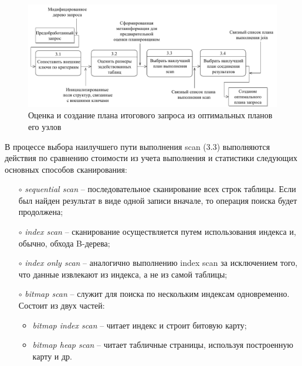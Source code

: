 \begin{figure}[ht!]
	\captionsetup{justification=centering}
	\includegraphics[scale=0.6]{images/dfd_level_3}
	\caption{Оценка и создание плана итогового запроса из оптимальных планов его узлов}
	\label{image:dfd_level_3}
\end{figure}

В процессе выбора наилучшего пути выполнения scan (3.3) выполняются действия по сравнению стоимости из учета выполнения и статистики следующих основных способов сканирования:
\begin{itemize}
	\item[$\circ$] \textit{sequential scan} -- последовательное сканирование всех строк таблицы. Если был найден результат в виде одной записи вначале, то операция поиска будет продолжена; \vspace{-0.2cm}
	\item[$\circ$] \textit{index scan} -- сканирование осуществляется путем использования индекса и, обычно, обхода B-дерева;\vspace{-0.2cm}
	\item[$\circ$] \textit{index only scan} -- аналогично выполнению index scan за исключением того, что данные извлекают из индекса, а не из самой таблицы;\vspace{-0.2cm}
	\item[$\circ$] \textit{bitmap scan} -- служит для поиска по нескольким индексам одновременно. Состоит из двух частей:\vspace{-0.2cm}
	\begin{itemize}
		\item \textit{bitmap index scan} -- читает индекс и строит битовую карту;\vspace{-0.2cm}
		\item \textit{bitmap heap scan} -- читает табличные страницы, используя построенную карту и др.\vspace{-0.2cm} 
	\end{itemize}
\end{itemize}

